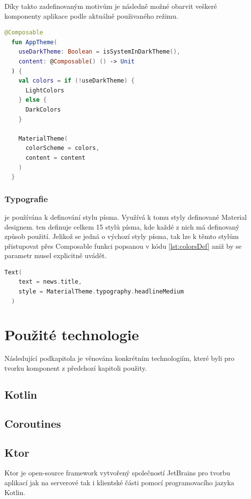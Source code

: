 Díky takto zadefinovaným motivům je následně možné obarvit veškeré komponenty aplikace podle aktuálně použivaného režimu.

\begin{lstlisting}[caption={Definice barevných motivů}, label={lst:colorsDef}, language=Kotlin]
  @Composable
  fun AppTheme(
    useDarkTheme: Boolean = isSystemInDarkTheme(),
    content: @Composable() () -> Unit
  ) {
    val colors = if (!useDarkTheme) {
      LightColors
    } else {
      DarkColors
    }
  
    MaterialTheme(
      colorScheme = colors,
      content = content
    )
  }
\end{lstlisting}

\subsubsection{Typografie}
je používána k definování stylu písma. Využívá k tomu styly definované Material designem. ten definuje celkem 15 stylů písma,
kde každé z nich má definovaný způsob použití. \cite{material3} Jelikož se jedná o výchozí styly písma, tak lze k těmto stylům přistupovat přes
Composable funkci  popsanou v kódu \ref{lst:colorsDef} aniž by se parametr  musel explicitně
uvádět.

\begin{lstlisting}[caption={Ukázka použití stylu písma}, label={lst:typographyExample}, language=Kotlin]
  Text(
    text = news.title,
    style = MaterialTheme.typography.headlineMedium
  )
\end{lstlisting}

\section{Použité technologie}
Následující podkapitola je věnována konkrétním technologiím, které byli pro tvorku komponent z předchozí kapitoli použity.

\subsection{Kotlin}
\subsection{Coroutines}
\subsection{Ktor}
Ktor je open-source framework vytvořený společností JetBrains pro tvorbu aplikací jak na serverové tak i klientské části pomocí programovacího 
jazyka Kotlin.


